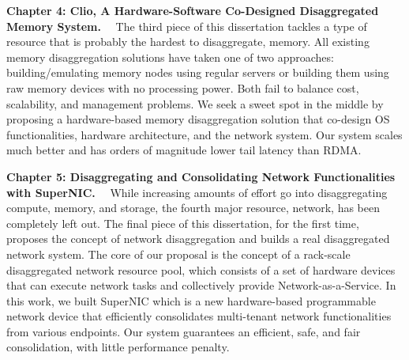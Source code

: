 \textbf{Chapter 4: Clio, A Hardware-Software Co-Designed Disaggregated Memory System.}~~
The third piece of this dissertation
tackles a type of resource that is probably the hardest to disaggregate, memory.
All existing memory disaggregation solutions have taken one of two approaches:
building/emulating memory nodes using regular servers or
building them using raw memory devices with no processing power.
%
Both fail to balance cost, scalability, and management problems.
%
We seek a sweet spot in the middle by proposing a hardware-based
memory disaggregation solution that co-design OS functionalities,
hardware architecture, and the network system.
Our system scales much better and has orders of magnitude lower
tail latency than RDMA.

\textbf{Chapter 5: Disaggregating and Consolidating Network Functionalities with SuperNIC.}~~
While increasing amounts of effort go into disaggregating compute, memory, and storage, the fourth major resource, network, has been completely left out.
The final piece of this dissertation, for the first time, proposes the concept of network disaggregation and builds a real disaggregated network system.
The core of our proposal is the concept of a rack-scale disaggregated network resource pool, which consists of a set of hardware devices that can execute network tasks and collectively provide Network-as-a-Service.
In this work, we built SuperNIC which is a new hardware-based programmable network device that
efficiently consolidates multi-tenant network functionalities from various endpoints.
Our system guarantees an efficient, safe, and fair consolidation, with little performance penalty.